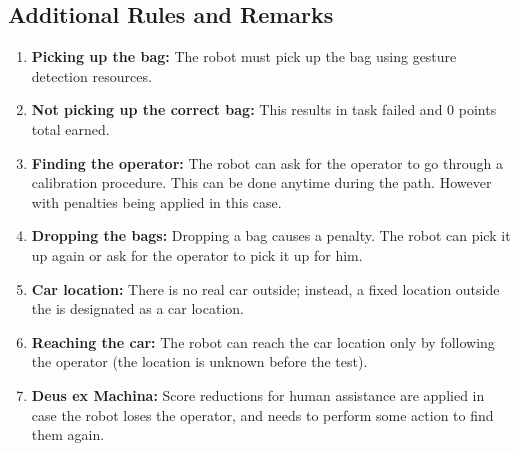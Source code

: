 \subsection*{Additional Rules and Remarks}
\begin{enumerate}[nosep]

	\item \textbf{Picking up the bag:} The robot must pick up the bag using gesture detection resources.
    \item \textbf{Not picking up the correct bag:} This results in task failed and 0 points total earned.
    \item \textbf{Finding the operator:} The robot can ask for the operator to go through a calibration procedure. This can be done anytime during the path. However with penalties being applied in this case.
    \item \textbf{Dropping the bags:} Dropping a bag causes a penalty. The robot can pick it up again or ask for the operator to pick it up for him.
	\item \textbf{Car location:} There is no real car outside; instead, a fixed location outside the \Arena{} is designated as a car location.
	\item \textbf{Reaching the car:} The robot can reach the car location only by following the operator (the location is unknown before the test).
	\item \textbf{Deus ex Machina:} Score reductions for human assistance are applied in case the robot loses the operator, and needs to perform some action to find them again. %
\end{enumerate}


